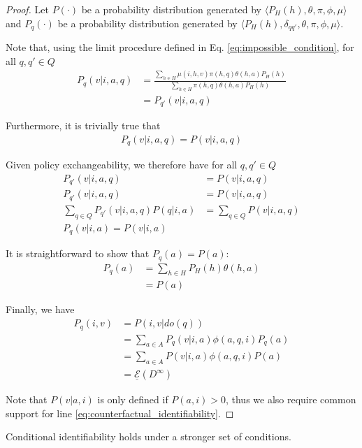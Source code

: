 \begin{proof}
Let $P(\cdot)$ be a probability distribution generated by $\langle P_H(h),\theta,\pi,\phi,\mu \rangle$ and $P_q(\cdot)$ be a probability distribution generated by $\langle P_H(h),\delta_{qq'},\theta,\pi,\phi,\mu \rangle$.

Note that, using the limit procedure defined in Eq. \ref{eq:impossible_condition}, for all $q,q'\in Q$
\begin{align}
    P_q(v|i,a,q) &= \frac{\sum_{h\in H} \mu(i,h,v)\pi(h,q) \theta(h,a) P_H(h)}{\sum_{h\in H} \pi(h,q) \theta(h,a) P_H(h)} \\
                 &= P_{q'}(v|i,a,q)
\end{align}

Furthermore, it is trivially true that
\begin{align}
    P_q(v|i,a,q) = P(v|i,a,q)
\end{align}

Given policy exchangeability, we therefore have for all $q,q'\in Q$
\begin{align}
    P_{q'}(v|i,a,q) &= P(v|i,a,q)\\
    P_{q'}(v|i,a,q) &= P(v|i,a,q)\\
    \sum_{q\in Q} P_{q'}(v|i,a,q) P(q|i,a) &= \sum_{q\in Q} P(v|i,a,q) \\
    P_q(v|i,a) = P(v|i,a)
\end{align}

It is straightforward to show that $P_q(a) = P(a)$:
\begin{align}
    P_q(a) &= \sum_{h\in H} P_H(h) \theta(h,a) \\
           &= P(a)
\end{align}

Finally, we have
\begin{align}
    P_q(i,v) &= P(i,v|do(q))\\
             &= \sum_{a\in A} P_q(v|i,a) \phi(a,q,i) P_q(a)\\
             &= \sum_{a\in A} P(v|i,a) \phi(a,q,i) P(a)\\ \label{eq:counterfactual_identifiability}
             &= \underline{\mathscr{E}}(D^\infty)
\end{align}

Note that $P(v|a,i)$ is only defined if $P(a,i)>0$, thus we also require common support for line \ref{eq:counterfactual_identifiability}.
\end{proof}

Conditional identifiability holds under a stronger set of conditions.

